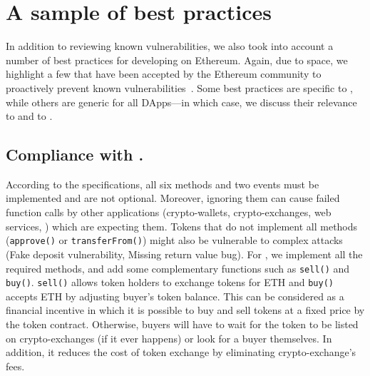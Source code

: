 
\section{A sample of best practices}\label{section:bp}

In addition to reviewing known vulnerabilities, we also took into account a number of best practices for developing \erc on Ethereum. Again, due to space, we highlight a few that have been accepted by the Ethereum community to proactively prevent known vulnerabilities~\cite{TokenBP}. Some best practices are specific to \erc, while others are generic for all DApps---in which case, we discuss their relevance to \erc and to \sys.

\subsection{Compliance with \erc.}

According to the \erc specifications, all six methods and two events must be implemented and are not optional. Moreover, ignoring them can cause failed function calls by other applications (\ie crypto-wallets, crypto-exchanges, web services, \etc) which are expecting them. Tokens that do not implement all methods (\eg \texttt{approve()} or \texttt{transferFrom()}) might also be vulnerable to complex attacks (\eg Fake deposit vulnerability\cite{DEPOSafe}, Missing return value bug\cite{ErcBug}). For \sys, we implement all the required methods, and add some complementary functions such as \texttt{sell()} and \texttt{buy()}. \texttt{sell()} allows token holders to exchange tokens for ETH and \texttt{buy()} accepts ETH by adjusting buyer's token balance. {\blue This can be considered as a financial incentive in which it is possible to buy and sell tokens at a fixed price by the token contract. Otherwise, buyers will have to wait for the token to be listed on crypto-exchanges (if it ever happens) or look for a buyer themselves. In addition, it reduces the cost of token exchange by eliminating crypto-exchange's fees.}

%


